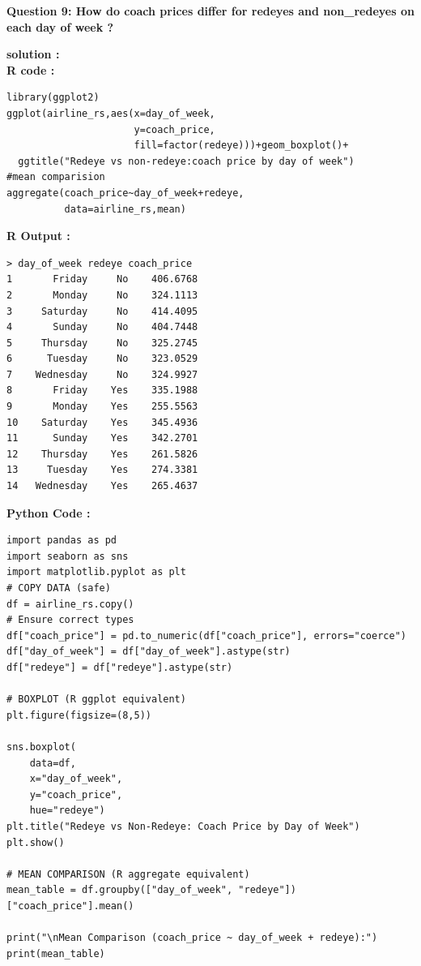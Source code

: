 \documentclass[11pt,a4paper]{article}
\begin{document}
\noindent \textbf{\large Question 9: 
How do coach prices differ for redeyes and non\_redeyes on each day of week ?}

\vspace{1em}
\noindent \textbf{solution :}\\
\noindent\textbf{R code :}
\begin{codebox}
\begin{lstlisting}[style=Rstyle]
library(ggplot2)
ggplot(airline_rs,aes(x=day_of_week,
                      y=coach_price,
                      fill=factor(redeye)))+geom_boxplot()+
  ggtitle("Redeye vs non-redeye:coach price by day of week")
#mean comparision
aggregate(coach_price~day_of_week+redeye,
          data=airline_rs,mean)
\end{lstlisting}
\end{codebox}
\vspace{0.5em}
\noindent \textbf{R Output :}
\begin{verbatim}
> day_of_week redeye coach_price
1       Friday     No    406.6768
2       Monday     No    324.1113
3     Saturday     No    414.4095
4       Sunday     No    404.7448
5     Thursday     No    325.2745
6      Tuesday     No    323.0529
7    Wednesday     No    324.9927
8       Friday    Yes    335.1988
9       Monday    Yes    255.5563
10    Saturday    Yes    345.4936
11      Sunday    Yes    342.2701
12    Thursday    Yes    261.5826
13     Tuesday    Yes    274.3381
14   Wednesday    Yes    265.4637
\end{verbatim}
\vspace{0.5em}
\noindent \textbf{Python Code :}
\begin{codebox}
\begin{lstlisting}[style=Pythonstyle]
import pandas as pd
import seaborn as sns
import matplotlib.pyplot as plt
# COPY DATA (safe)
df = airline_rs.copy()
# Ensure correct types
df["coach_price"] = pd.to_numeric(df["coach_price"], errors="coerce")
df["day_of_week"] = df["day_of_week"].astype(str)
df["redeye"] = df["redeye"].astype(str)

# BOXPLOT (R ggplot equivalent)
plt.figure(figsize=(8,5))

sns.boxplot(
    data=df,
    x="day_of_week",
    y="coach_price",
    hue="redeye")
plt.title("Redeye vs Non-Redeye: Coach Price by Day of Week")
plt.show()

# MEAN COMPARISON (R aggregate equivalent)
mean_table = df.groupby(["day_of_week", "redeye"])["coach_price"].mean()

print("\nMean Comparison (coach_price ~ day_of_week + redeye):")
print(mean_table)
\end{lstlisting}
\end{codebox}
\end{document}
